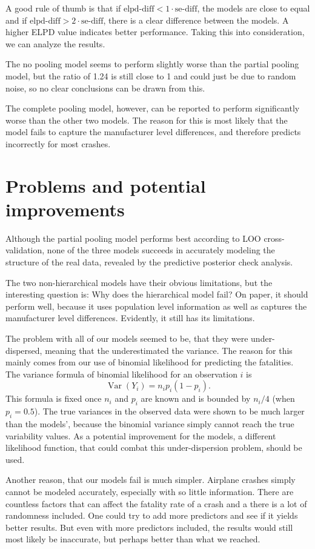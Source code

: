 \documentclass[12pt,a4paper]{article}
\begin{document}
A good rule of thumb is that if \(\text{elpd-diff} < 1 \cdot \text{se-diff}\), the models are close to equal and if \(\text{elpd-diff} > 2 \cdot \text{se-diff}\), there is a clear difference between the models. A higher ELPD value indicates better performance. Taking this into consideration, we can analyze the results.

The no pooling model seems to perform slightly worse than the partial pooling model, but the ratio of 1.24 is still close to 1 and could just be due to random noise, so no clear conclusions can be drawn from this.

The complete pooling model, however, can be reported to perform significantly worse than the other two models. The reason for this is most likely that the model fails to capture the manufacturer level differences, and therefore predicts incorrectly for most crashes.


\section{Problems and potential improvements}

Although the partial pooling model performs best according to LOO cross-validation, none of the three models succeeds in accurately modeling the structure of the real data, revealed by the predictive posterior check analysis.

The two non-hierarchical models have their obvious limitations, but the interesting question is: Why does the hierarchical model fail? On paper, it should perform well, because it uses population level information as well as captures the manufacturer level differences. Evidently, it still has its limitations.

The problem with all of our models seemed to be, that they were under-dispersed, meaning that the underestimated the variance. The reason for this mainly comes from our use of binomial likelihood for predicting the fatalities. The variance formula of binomial likelihood for an observation \(i\) is
$$\operatorname{Var}(Y_i) = n_i p_i (1 - p_i).$$
This formula is fixed once \(n_i\) and \(p_i\) are known and is bounded by \(n_i / 4\) (when \(p_i = 0.5\)). The true variances in the observed data were shown to be much larger than the models', because the binomial variance simply cannot reach the true variability values. As a potential improvement for the models, a different likelihood function, that could combat this under-dispersion problem, should be used.

Another reason, that our models fail is much simpler. Airplane crashes simply cannot be modeled accurately, especially with so little information. There are countless factors that can affect the fatality rate of a crash and a there is a lot of randomness included. One could try to add more predictors and see if it yields better results. But even with more predictors included, the results would still most likely be inaccurate, but perhaps better than what we reached.
\end{document}
